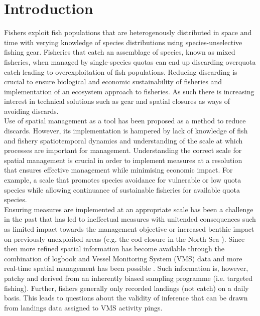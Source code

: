 \documentclass[review]{elsarticle}
\begin{document}
\linenumbers

\section{Introduction}

%
Fishers exploit fish populations that are heterogenously distributed in space
and time with verying knowledge of species distributions using
species-unselective fishing gear. Fisheries that catch an assemblage of
species, known as mixed fisheries, when managed by single-species quotas can
end up discarding overquota catch leading to overexploitation of fish
populations. Reducing discarding is crucial to ensure biological and economic
sustainability of fisheries and implementation of an ecosystem approach to
fisheries. As such there is increasing interest in technical solutions such as
gear and spatial closures as ways of avoiding discards.  \\

Use of spatial management as a tool has been proposed as a method to reduce
discards. However, its implementation is hampered by lack of knowledge of fish
and fishery spatiotemporal dynamics and understanding of the scale at which
processes are important for management. Understanding the correct scale for
spatial management is crucial in order to implement measures at a resolution
that ensures effective management \citep{Dunn2016} while minimising economic
impact. For example, a scale that promotes species avoidance for vulnerable or
low quota species while allowing continuance of sustainable fisheries for
available quota species. \\

Ensuring measures are implemented at an appropriate scale has been a challenge
in the past that has led to ineffectual measures with unitended consequences
such as limited impact towards the management objective or increased benthic
impact on previously unexploited areas (e.g. the cod closure in the North
Sea \citep{Rijnsdorp2001,Dinmore2003}). Since then more refined spatial
information has become available through the combination of logbook and Vessel
Monitoring System (VMS) data \citep{Lee2010, Bastardie2010, Gerritsen2012,
	Mateo2016} and more real-time spatial management has been possible 
	\citep[e.g.][]{Holmes2011}. Such information is, however, patchy and
derived from an inherently biased sampling programme (i.e. targeted fishing).
Further, fishers generally only recorded landings (not catch) on a daily basis.
This leads to questions about the validity of inference that can be drawn from
landings data assigned to VMS activity pings. \\ 
\end{document}
